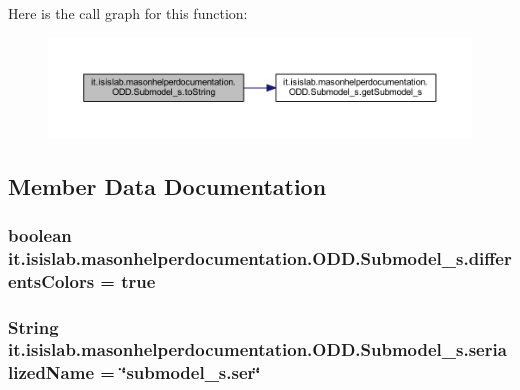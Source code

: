 Here is the call graph for this function\-:
\nopagebreak
\begin{figure}[H]
\begin{center}
\leavevmode
\includegraphics[width=350pt]{classit_1_1isislab_1_1masonhelperdocumentation_1_1_o_d_d_1_1_submodel__s_a4f23339b028b73e93d58b4aa051b9947_cgraph}
\end{center}
\end{figure}




\subsection{Member Data Documentation}
\hypertarget{classit_1_1isislab_1_1masonhelperdocumentation_1_1_o_d_d_1_1_submodel__s_a135ce4524aa1bc14a7e6c653e47f188e}{
\subsubsection[{differents\-Colors}]{\setlength{\rightskip}{0pt plus 5cm}boolean it.\-isislab.\-masonhelperdocumentation.\-O\-D\-D.\-Submodel\-\_\-s.\-differents\-Colors = true\hspace{0.3cm}{\ttfamily [static]}}}\label{classit_1_1isislab_1_1masonhelperdocumentation_1_1_o_d_d_1_1_submodel__s_a135ce4524aa1bc14a7e6c653e47f188e}
\hypertarget{classit_1_1isislab_1_1masonhelperdocumentation_1_1_o_d_d_1_1_submodel__s_a7f63b7178d8b6b8d9da0c24d79f031f6}{
\subsubsection[{serialized\-Name}]{\setlength{\rightskip}{0pt plus 5cm}String it.\-isislab.\-masonhelperdocumentation.\-O\-D\-D.\-Submodel\-\_\-s.\-serialized\-Name = \char`\"{}submodel\-\_\-s.\-ser\char`\"{}\hspace{0.3cm}{\ttfamily [static]}}}\label{classit_1_1isislab_1_1masonhelperdocumentation_1_1_o_d_d_1_1_submodel__s_a7f63b7178d8b6b8d9da0c24d79f031f6}
